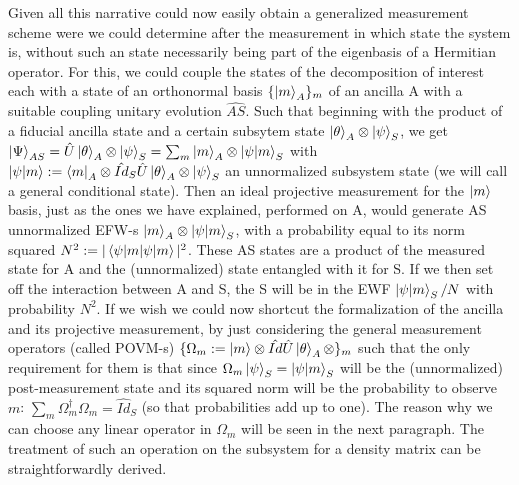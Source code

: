\documentclass[11pt, a4paper]{article} %
\begin{document}
Given all this narrative could now easily obtain a generalized measurement scheme were we could determine after the measurement in which state the system is, without such an state necessarily being part of the eigenbasis of a Hermitian operator. For this, we could couple the states of the decomposition of interest each with a state of an orthonormal basis $\{\ket{m}_A\}_m$ of an ancilla A with a suitable coupling unitary evolution $\hat{AS}$. Such that beginning with the product of a fiducial ancilla state and a certain subsytem state $\ket{\theta}_A\otimes\ket{\psi}_S$, we get $\ket{\Psi}_{AS}=\hat{U}\ket{\theta}_A\otimes\ket{\psi}_S=\sum_m \ket{m}_A\otimes \ket{\psi|m}_S$ with $\ket{\psi|m}:=\bra{m}_A\otimes\hat{Id}_S \hat{U}\ket{\theta}_A\otimes\ket{\psi}_S$ an unnormalized subsystem state (we will call a general conditional state). Then an ideal projective measurement for the $\ket{m}$ basis, just as the ones we have explained, performed on A, would generate AS unnormalized EFW-s $\ket{m}_A\otimes \ket{\psi|m}_S$, with a probability equal to its norm squared $N^2:=|\bra{\psi|m}\ket{\psi|m}|^2$. These AS states are a product of the measured state for A and the (unnormalized) state entangled with it for S. If we then set off the interaction between A and S, the S will be in the EWF $\ket{\psi|m}_S/N$ with probability $N^2$. If we wish we could now shortcut the formalization of the ancilla and its projective measurement, by just considering the general measurement operators (called POVM-s) $\{\Omega_m:=\ket{m}\otimes\hat{Id}\hat{U}\ket{\theta}_A\otimes\}_m$ such that the only requirement for them is that since $\Omega_m\ket{\psi}_S=\ket{\psi|m}_S$ will be the (unnormalized) post-measurement state and its squared norm will be the probability to observe $m$: $\sum_m \Omega_m^\dagger\Omega_m=\hat{Id}_S$ (so that probabilities add up to one). The reason why we can choose any linear operator in $\Omega_m$ will be seen in the next paragraph. The treatment of such an operation on the subsystem for a density matrix can be straightforwardly derived.
\end{document}
